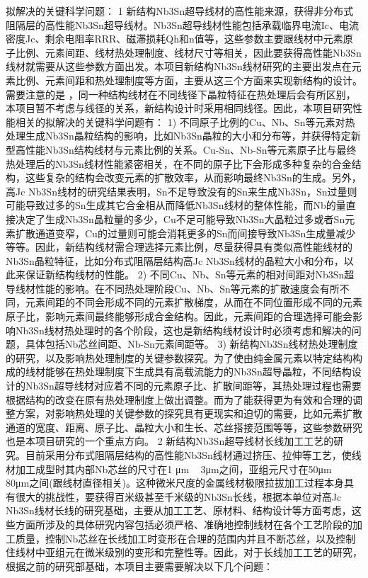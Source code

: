 \documentclass[12pt, a4paper]{ctexbook}
\begin{document}
拟解决的关键科学问题：
1 新结构Nb3Sn超导线材的高性能来源，获得非分布式阻隔层的高性能Nb3Sn超导线材。Nb3Sn超导线材性能包括承载临界电流Ic、电流密度Jc、剩余电阻率RRR、磁滞损耗Qh和n值等，这些参数主要跟线材中元素原子比例、元素间距、线材热处理制度、线材尺寸等相关，因此要获得高性能Nb3Sn线材就需要从这些参数方面出发。本项目新结构Nb3Sn线材研究的主要出发点在元素比例、元素间距和热处理制度等方面，主要从这三个方面来实现新结构的设计。需要注意的是 ，同一种结构线材在不同线径下晶粒特征在热处理后会有所区别，本项目暂不考虑与线径的关系，新结构设计时采用相同线径。因此，本项目研究性能相关的拟解决的关键科学问题有：
1) 不同原子比例的Cu、Nb、Sn等元素对热处理生成Nb3Sn晶粒结构的影响，比如Nb3Sn晶粒的大小和分布等，并获得特定新型高性能Nb3Sn结构线材与元素比例的关系。Cu-Sn、Nb-Sn等元素原子比与最终热处理后的Nb3Sn线材性能紧密相关，在不同的原子比下会形成多种复杂的合金结构，这些复杂的结构会改变元素的扩散效率，从而影响最终Nb3Sn的生成。另外，高Jc Nb3Sn线材的研究结果表明，Sn不足导致没有的Sn来生成Nb3Sn，Sn过量则可能导致过多的Sn生成其它合金相从而降低Nb3Sn线材的整体性能，而Nb的量直接决定了生成Nb3Sn晶粒量的多少，Cu不足可能导致Nb3Sn大晶粒过多或者Sn元素扩散通道变窄，Cu的过量则可能会消耗更多的Sn而间接导致Nb3Sn生成量减少等等。因此，新结构线材需合理选择元素比例，尽量获得具有类似高性能线材的Nb3Sn晶粒特征，比如分布式阻隔层结构高Jc Nb3Sn线材的晶粒大小和分布，以此来保证新结构线材的性能。 
2) 不同Cu、Nb、Sn等元素的相对间距对Nb3Sn超导线材性能的影响。在不同热处理阶段Cu、Nb、Sn等元素的扩散速度会有所不同，元素间距的不同会形成不同的元素扩散梯度，从而在不同位置形成不同的元素原子比，影响元素间最终能够形成合金结构。因此，元素间距的合理选择可能会影响Nb3Sn线材热处理时的各个阶段，这也是新结构线材设计时必须考虑和解决的问题，具体包括Nb芯丝间距、Nb-Sn元素间距等。
3) 新结构Nb3Sn线材热处理制度的研究，以及影响热处理制度的关键参数探究。为了使由纯金属元素以特定结构构成的线材能够在热处理制度下生成具有高载流能力的Nb3Sn超导晶粒，不同结构设计的Nb3Sn超导线材对应着不同的元素原子比、扩散间距等，其热处理过程也需要根据结构的改变在原有热处理制度上做出调整。而为了能获得更为有效和合理的调整方案，对影响热处理的关键参数的探究具有更现实和迫切的需要，比如元素扩散通道的宽度、距离、原子比、晶粒大小和生长、芯丝搭接范围等等，这些参数研究也是本项目研究的一个重点方向。
2 新结构Nb3Sn超导线材长线加工工艺的研究。目前采用分布式阻隔层结构的高性能Nb3Sn线材通过挤压、拉伸等工艺，使线材加工成型时其内部Nb芯丝的尺寸在1 μm ~ 3μm之间，亚组元尺寸在50μm ~ 80μm之间(跟线材直径相关)。这种微米尺度的金属线材极限拉拔加工过程本身具有很大的挑战性，要获得百米级甚至千米级的Nb3Sn长线，根据本单位对高Jc Nb3Sn线材长线的研究基础，主要从加工工艺、原材料、结构设计等方面考虑，这些方面所涉及的具体研究内容包括必须严格、准确地控制线材在各个工艺阶段的加工质量，控制Nb芯丝在长线加工时变形在合理的范围内并且不断芯丝，以及控制住线材中亚组元在微米级别的变形和完整性等。因此，对于长线加工工艺的研究，根据之前的研究部基础，本项目主要需要解决以下几个问题：
\end{document}
